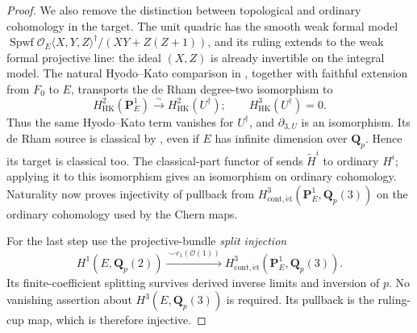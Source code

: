 \documentclass[11pt,a4paper]{amsart}
\numberwithin{equation}{section}
\theoremstyle{definition}
\theoremstyle{remark}
\newcommand{\Q}{\mathbf Q}
\newcommand{\PP}{\mathbf P}
\newcommand{\OO}{\mathcal O}
\begin{document}
\begin{proof}
We also remove the distinction between topological and ordinary
cohomology in the target. The unit quadric has the smooth weak formal
model
$\operatorname{Spwf}\OO_E\langle X,Y,Z\rangle^\dagger/
(XY+Z(Z+1))$, and its ruling extends to the weak formal projective
line: the ideal $(X,Z)$ is already invertible on the integral model.
The natural Hyodo--Kato comparison in
\cite[equation~(5.4) and the following strict quasi-isomorphism,
Propositions~5.5--5.6]{ColmezNiziol}, together with faithful extension
from $F_0$ to $E$, transports the de Rham degree-two isomorphism to
\[
 H^2_{\mathrm{HK}}(\PP^1_E)
       \xrightarrow{\sim}H^2_{\mathrm{HK}}(U^\dagger);
 \qquad H^3_{\mathrm{HK}}(U^\dagger)=0.
\]
Thus the same Hyodo--Kato term vanishes for $U^\dagger$, and
$\partial_{3,U}$ is an isomorphism.
Its de Rham source is classical by
\cite[Section~5.1]{ColmezNiziol}, even if $E$ has infinite dimension
over $\Q_p$. Hence its target is classical too.
The classical-part functor of \cite[Section~3.1.1]{ColmezNiziol}
sends $\widetilde H^i$ to ordinary $H^i$; applying it to this
isomorphism gives an isomorphism on ordinary cohomology.
Naturality now proves injectivity of pullback from
$H^3_{\mathrm{cont},\mathrm{\acute et}}(\PP^1_E,\Q_p(3))$ on the
ordinary cohomology used by the Chern maps.

For the last step use the projective-bundle \emph{split injection}
\[
 H^1(E,\Q_p(2))
 \xrightarrow{\ \smile c_1(\OO(1))\ }
 H^3_{\mathrm{cont},\mathrm{\acute et}}(\PP^1_E,\Q_p(3)).
\]
Its finite-coefficient splitting survives derived inverse limits and
inversion of $p$. No vanishing assertion about
$H^3(E,\Q_p(3))$ is required.
Its pullback is the ruling-cup map, which is therefore
injective.
\end{proof}
\end{document}
